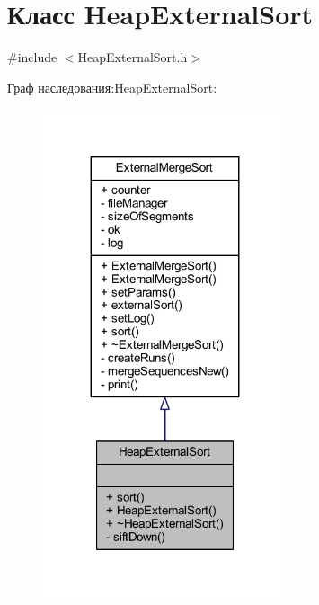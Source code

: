 \hypertarget{class_heap_external_sort}{}\section{Класс Heap\+External\+Sort}
\label{class_heap_external_sort}


{\ttfamily \#include $<$Heap\+External\+Sort.\+h$>$}



Граф наследования\+:Heap\+External\+Sort\+:\nopagebreak
\begin{figure}[H]
\begin{center}
\leavevmode
\includegraphics[width=203pt]{class_heap_external_sort__inherit__graph}
\end{center}
\end{figure}



